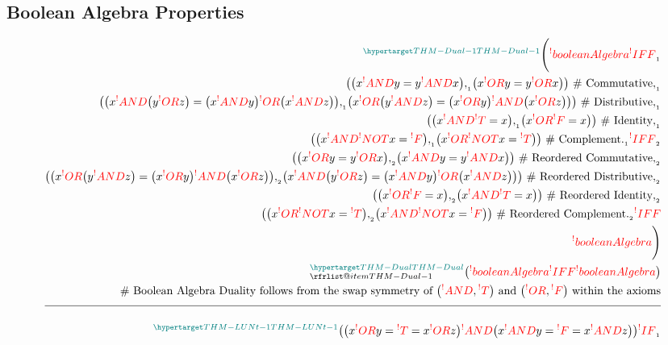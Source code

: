 \documentclass[a4paper]{article}
\makeatletter
\def\ml{\mleft}
\def\mr{\mright}
\newcommand{\eq}{=}
\newcommand{\cusand}{,}
\newcommand{\cusend}{.}
\newcommand{\cusnum}[2]{{#1}_{{\phantom{ }}_{#2}}}
\newcommand{\eqComment}[1]{\text{  \# #1}}
\newcommand{\n}{\\[1.5ex] \hline \nonumber \\[0ex]}
\newcommand{\m}{\nonumber \\}
\newcommand\rfrlist[1]{%
    \forcsvlist{\rfrlist@item}{#1}
}
\newcommand\rfrlist@item[1]{\rfr{#1}\\}
\newcommand{\thmlink}[2]{{}_{\substack{\rfrlist{#1}}}^{\dfn{#2}} }
\makeatother
\begin{document}
\subsection{Boolean Algebra Properties}
\begin{tcolorbox}
\begin{align}
     \thmlink{}{THM-Dual-1} \Bigg(\rfr{booleanAlgebra} [\{\rfr{T}, \rfr{F}\}, \rfr{AND}, \rfr{OR}, \rfr{NOT}][] \cusnum{\rfr{IFF}}{1}
\m \ml(\ml(x \rfr{AND} y \eq y \rfr{AND} x\mr) \cusnum{\cusand}{1} \ml(x \rfr{OR} y \eq y \rfr{OR} x\mr)\mr) \eqComment{Commutative} \cusnum{\cusand}{1}
\m \ml(\ml(x \rfr{AND} \ml(y \rfr{OR} z\mr) \eq \ml(x \rfr{AND} y\mr) \rfr{OR} \ml(x \rfr{AND} z\mr)\mr) \cusnum{\cusand}{1} \ml(x \rfr{OR} \ml(y \rfr{AND} z\mr) \eq \ml(x \rfr{OR} y\mr) \rfr{AND} \ml(x \rfr{OR} z\mr)\mr)\mr) \eqComment{Distributive} \cusnum{\cusand}{1}
\m \ml(\ml(x \rfr{AND} \rfr{T} \eq x\mr) \cusnum{\cusand}{1} \ml(x \rfr{OR} \rfr{F} \eq x\mr)\mr) \eqComment{Identity} \cusnum{\cusand}{1}
\m \ml(\ml(x \rfr{AND} \rfr{NOT} x \eq \rfr{F}\mr) \cusnum{\cusand}{1} \ml(x \rfr{OR} \rfr{NOT} x \eq \rfr{T}\mr)\mr) \eqComment{Complement} \cusnum{\cusend}{1} \cusnum{\rfr{IFF}}{2}
\m \ml(\ml(x \rfr{OR} y \eq y \rfr{OR} x\mr) \cusnum{\cusand}{2} \ml(x \rfr{AND} y \eq y \rfr{AND} x\mr)\mr) \eqComment{Reordered Commutative} \cusnum{\cusand}{2}
\m \ml(\ml(x \rfr{OR} \ml(y \rfr{AND} z\mr) \eq \ml(x \rfr{OR} y\mr) \rfr{AND} \ml(x \rfr{OR} z\mr)\mr) \cusnum{\cusand}{2} \ml(x \rfr{AND} \ml(y \rfr{OR} z\mr) \eq \ml(x \rfr{AND} y\mr) \rfr{OR} \ml(x \rfr{AND} z\mr)\mr)\mr) \eqComment{Reordered Distributive} \cusnum{\cusand}{2}
\m \ml(\ml(x \rfr{OR} \rfr{F} \eq x\mr) \cusnum{\cusand}{2} \ml(x \rfr{AND} \rfr{T} \eq x\mr)\mr) \eqComment{Reordered Identity} \cusnum{\cusand}{2}
\m \ml(\ml(x \rfr{OR} \rfr{NOT} x \eq \rfr{T}\mr) \cusnum{\cusand}{2} \ml(x \rfr{AND} \rfr{NOT} x \eq \rfr{F}\mr)\mr) \eqComment{Reordered Complement} \cusnum{\cusend}{2} \rfr{IFF}
\m \rfr{booleanAlgebra} [\{\rfr{F}, \rfr{T}\}, \rfr{OR}, \rfr{AND}, \rfr{NOT}][]\Bigg)
\m \thmlink{THM-Dual-1}{THM-Dual} \ml(\rfr{booleanAlgebra} [\{\rfr{T}, \rfr{F}\}, \rfr{AND}, \rfr{OR}, \rfr{NOT}][] \rfr{IFF} \rfr{booleanAlgebra} [\{\rfr{F}, \rfr{T}\}, \rfr{OR}, \rfr{AND}, \rfr{NOT}][]\mr)
\m \eqComment{Boolean Algebra Duality follows from the swap symmetry of $\ml(\rfr{AND}, \rfr{T}\mr)$ and $\ml(\rfr{OR}, \rfr{F}\mr)$ within the axioms}
    \n \thmlink{}{THM-LUNt-1} \ml(\ml(x \rfr{OR} y \eq \rfr{T} \eq x \rfr{OR} z\mr) \rfr{AND} \ml(x \rfr{AND} y \eq \rfr{F} \eq x \rfr{AND} z\mr)\mr) \cusnum{\rfr{IF}}{1}

\end{align}
\end{tcolorbox}
\end{document}
